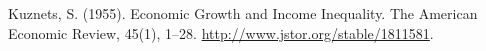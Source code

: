\begin{thebibliography}{X}
    Kuznets, S. (1955). Economic Growth and Income Inequality. The American Economic Review, 45(1), 1–28. \url{http://www.jstor.org/stable/1811581}.
\end{thebibliography}
